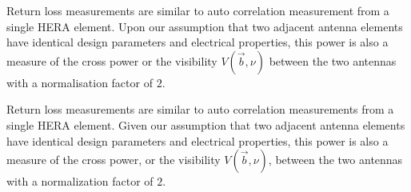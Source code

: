 \documentclass[twocolumn]{emulateapj}
\newcommand{\vis}{{V}}
\newcommand{\dfngexp}{{e^{2\pi i\nu \Delta \tau}}}
\begin{document}



Return loss measurements are similar to auto correlation measurement from a single HERA element. Upon our assumption that two adjacent antenna elements have identical design parameters and electrical properties, this power is also a measure of the cross power or the visibility $\vis (\vec b, \nu)$ between the two antennas with a normalisation factor of $2$. 

%
Return loss measurements are similar to auto correlation measurements from a single HERA element. Given our assumption that two adjacent antenna elements have identical design parameters and electrical properties, this power is also a measure of the cross power, or the visibility $\vis (\vec b, \nu)$, between the two antennas with a normalization factor of $2$. 
%
\end{document}
